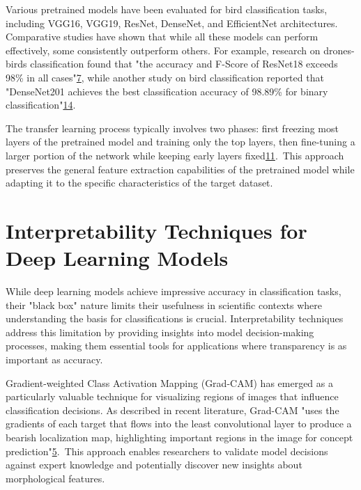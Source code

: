 \documentclass[a4paper,12pt]{article}
\begin{document}
Various pretrained models have been evaluated for bird classification tasks, including VGG16, VGG19, ResNet, DenseNet, and EfficientNet architectures. Comparative studies have shown that while all these models can perform effectively, some consistently outperform others. For example, research on drones-birds classification found that "the accuracy and F-Score of ResNet18 exceeds 98\% in all cases"\href{https://www.semanticscholar.org/paper/c16f57236555aae3f600ef8f1978eff10b410233}{7}, while another study on bird classification reported that "DenseNet201 achieves the best classification accuracy of 98.89\% for binary classification"\href{https://www.semanticscholar.org/paper/6529ad5f1094a8d9b0ab38db163c7fdaad2a1d9c}{14}.

The transfer learning process typically involves two phases: first freezing most layers of the pretrained model and training only the top layers, then fine-tuning a larger portion of the network while keeping early layers fixed\href{https://www.semanticscholar.org/paper/770ee68d1b136cd098a018a399d1f69af29faae0}{11}. This approach preserves the general feature extraction capabilities of the pretrained model while adapting it to the specific characteristics of the target dataset.

\section*{Interpretability Techniques for Deep Learning Models}
While deep learning models achieve impressive accuracy in classification tasks, their "black box" nature limits their usefulness in scientific contexts where understanding the basis for classifications is crucial. Interpretability techniques address this limitation by providing insights into model decision-making processes, making them essential tools for applications where transparency is as important as accuracy.

Gradient-weighted Class Activation Mapping (Grad-CAM) has emerged as a particularly valuable technique for visualizing regions of images that influence classification decisions. As described in recent literature, Grad-CAM "uses the gradients of each target that flows into the least convolutional layer to produce a bearish localization map, highlighting important regions in the image for concept prediction"\href{https://www.atlantis-press.com/article/125986223.pdf}{5}. This approach enables researchers to validate model decisions against expert knowledge and potentially discover new insights about morphological features.
\end{document}
